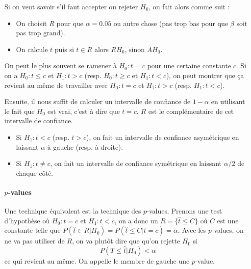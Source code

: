 Si on veut savoir s'il faut accepter ou rejeter $H_0$,
on fait alors comme suit :
\begin{itemize}
  \item On choisit $R$ pour que $\alpha = 0.05$ ou autre chose (pas trop bas pour que $\beta$ soit pas trop grand).
  \item On calcule $t$ puis si $t \in R$ alors $RH_0$, sinon $AH_0$.
\end{itemize}
On peut le plus souvent se ramener à $H_0: t = c$ pour une certaine constante $c$.
Si on a $H_0: t \leq c$ et $H_1: t > c$ (resp. $H_0: t \geq c$ et $H_1: t < c$),
on peut montrer que ça revient au même de travailler
avec $H_0: t = c$ et $H_1: t > c$ (resp. $H_1: t < c$).

Ensuite, il nous suffit de calculer un intervalle de confiance de $1-\alpha$ en utilisant le fait que $H_0$ est vrai,
c'est à dire que $t = c$, $R$ est le complémentaire de cet intervalle de confiance.
\begin{itemize}
  \item Si $H_1: t < c$ (resp. $t > c$), on fait un intervalle de confiance asymétrique en laissant $\alpha$ à gauche (resp. à droite).
  \item Si $H_1: t \neq c$, on fait un intervalle de confiance symétrique en laissant $\alpha/2$ de chaque côté.
\end{itemize}

\paragraph{$p$-values}
Une technique équivalent est la technique des $p$-values.
Prenons une test d'hypothèse où $H_0: t = c$ et $H_1: t < c$, on a donc un $R = \{\hat{t} \leq C\}$
où $C$ est une constante telle que $P(\hat{t} \in R | H_0) = P(\hat{t} \leq C | t = c) = \alpha$.
Avec les $p$-values, on ne va pas utiliser de $R$, on va plutôt dire que qu'on rejette $H_0$ si
$$P(T \leq \hat{t}|H_0) < \alpha$$
ce qui revient au même. On appelle le membre de gauche une $p$-value.

